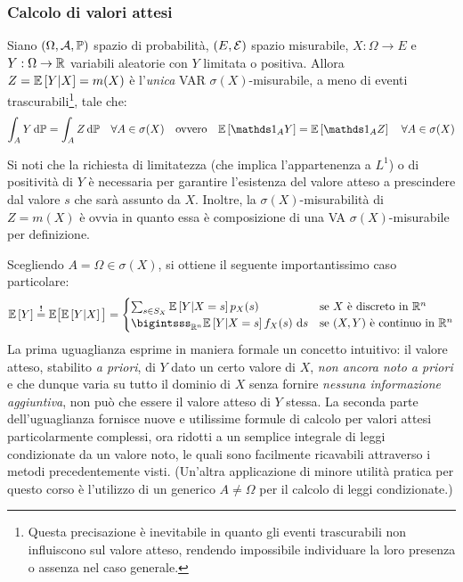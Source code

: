 
\subsubsection{Calcolo di valori attesi}

\begin{prop}
  Siano $(\Omega, \mathcal A, \mathbb P)$ spazio di probabilità, $(E, \mathcal E)$ spazio misurabile, $X: \Omega \to E$ e $Y: \Omega \to \mathbb R$ variabili aleatorie con $Y$ limitata o positiva. Allora $Z = \mathbb E \left[ Y|X \right] = m(X)$ è l'\emph{unica} VAR $\sigma(X)$-misurabile, a meno di eventi trascurabili\footnote{Questa precisazione è inevitabile in quanto gli eventi trascurabili non influiscono sul valore atteso, rendendo impossibile individuare la loro presenza o assenza nel caso generale.}, tale che:
  $$ \int_A Y \, \dPP = \int_A Z \, \dPP \quad \forall A \in \sigma(X)
  \quad \text{ovvero} \quad \Ex{\Ind_A Y} = \Ex{\Ind_A Z} \quad \forall A \in \sigma(X)
  $$
\end{prop}
Si noti che la richiesta di limitatezza (che implica l'appartenenza a $L^1$) o di positività di $Y$ è necessaria per garantire l'esistenza del valore atteso a prescindere dal valore $s$ che sarà assunto da $X$.
Inoltre, la $\sigma(X)$-misurabilità di $Z=m(X)$ è ovvia in quanto essa è composizione di una VA $\sigma(X)$-misurabile per definizione.

Scegliendo $A = \Omega \in \sigma(X)$, si ottiene il seguente importantissimo caso particolare: \label{formula-att-cond}
$$ \Ex{Y} \overset{\textbf{!}}{=} \EE\big[ \Ex{Y|X} \big] =
\begin{cases}
\sum_{s \in S_X} \Ex{Y|X=s} p_X(s) & \text{se $X$ è discreto in } \RR^n \\
\bigintsss_{\RR^n} \Ex{Y|X=s} f_X(s) \ \de s & \text{se $(X,Y)$ è continuo in } \RR^n
\end{cases}$$
La prima uguaglianza esprime in maniera formale un concetto intuitivo: il valore atteso, stabilito \emph{a priori}, di $Y$ dato un certo valore di $X$, \emph{non ancora noto a priori} e che dunque varia su tutto il dominio di $X$ senza fornire \emph{nessuna informazione aggiuntiva}, non può che essere il valore atteso di $Y$ stessa. La seconda parte dell'uguaglianza fornisce nuove e utilissime formule di calcolo per valori attesi particolarmente complessi, ora ridotti a un semplice integrale di leggi condizionate da un valore noto, le quali sono facilmente ricavabili attraverso i metodi precedentemente visti. (Un'altra applicazione di minore utilità pratica per questo corso è l'utilizzo di un generico $A \neq \Omega$ per il calcolo di leggi condizionate.)

